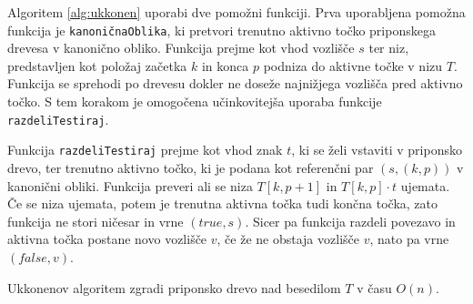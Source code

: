 Algoritem \ref{alg:ukkonen} uporabi dve pomožni funkciji. Prva uporabljena pomožna funkcija je \texttt{kanoničnaOblika}, ki pretvori trenutno aktivno točko priponskega drevesa v kanonično obliko. Funkcija prejme kot vhod vozlišče $s$ ter niz, predstavljen kot položaj začetka $k$ in konca $p$ podniza do aktivne točke v nizu $T$. Funkcija se sprehodi po drevesu dokler ne doseže najnižjega vozlišča pred aktivno točko. S tem korakom je omogočena učinkovitejša uporaba funkcije \texttt{razdeliTestiraj}.

Funkcija \texttt{razdeliTestiraj} prejme kot vhod znak $t$, ki se želi vstaviti v priponsko drevo, ter trenutno aktivno točko, ki je podana kot referenčni par $(s,(k,p))$ v kanonični obliki. Funkcija preveri ali se niza $T[k,p+1]$ in $T[k,p]\cdot t$ ujemata. Če se niza ujemata, potem je trenutna aktivna točka tudi končna točka, zato funkcija ne stori ničesar in vrne $(\textit{true},s)$. Sicer pa funkcija razdeli povezavo in aktivna točka postane novo vozlišče $v$, če že ne obstaja vozlišče $v$, nato pa vrne $(\textit{false},v)$. 


\begin{izr} \label{izr:ukkonen}
    Ukkonenov algoritem zgradi priponsko drevo nad besedilom $T$ v času $O(n)$.
\end{izr}


